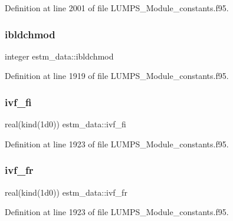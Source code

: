 Definition at line 2001 of file L\+U\+M\+P\+S\+\_\+\+Module\+\_\+constants.\+f95.

\mbox{\label{namespaceestm__data_acd010aa38e7e7891adb7711cc5b5944b}} 
\subsubsection{\texorpdfstring{ibldchmod}{ibldchmod}}
{\footnotesize\ttfamily integer estm\+\_\+data\+::ibldchmod}



Definition at line 1919 of file L\+U\+M\+P\+S\+\_\+\+Module\+\_\+constants.\+f95.

\mbox{\label{namespaceestm__data_aa3243d478e5262855b7f5a1eefdf2ab7}} 
\subsubsection{\texorpdfstring{ivf\+\_\+fi}{ivf\_fi}}
{\footnotesize\ttfamily real(kind(1d0)) estm\+\_\+data\+::ivf\+\_\+fi}



Definition at line 1923 of file L\+U\+M\+P\+S\+\_\+\+Module\+\_\+constants.\+f95.

\mbox{\label{namespaceestm__data_a446124d1b0c7c3982f913863e8b118ac}} 
\subsubsection{\texorpdfstring{ivf\+\_\+fr}{ivf\_fr}}
{\footnotesize\ttfamily real(kind(1d0)) estm\+\_\+data\+::ivf\+\_\+fr}



Definition at line 1923 of file L\+U\+M\+P\+S\+\_\+\+Module\+\_\+constants.\+f95.

\mbox{\label{namespaceestm__data_a8076ec4c1665548b2e7641b569e39efc}} 
